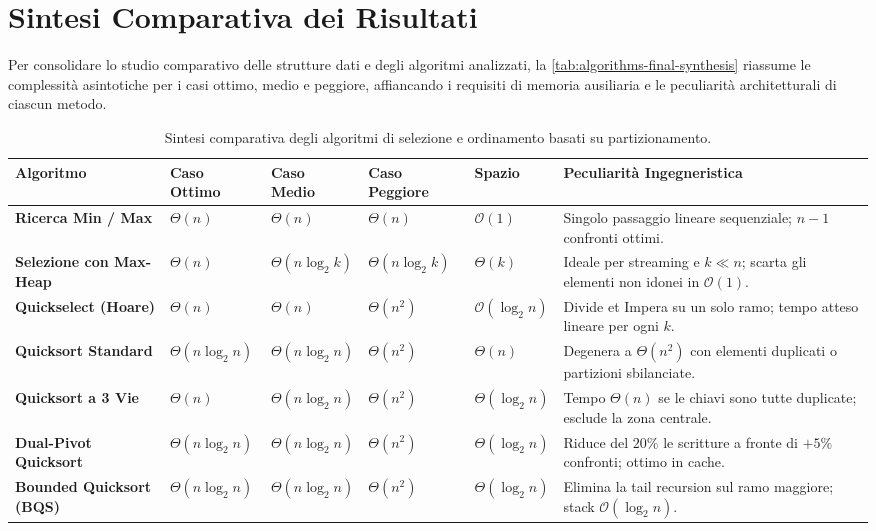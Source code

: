 \FloatBarrier
\section{Sintesi Comparativa dei Risultati}
\label{sec:comparative-results-summary}

Per consolidare lo studio comparativo delle strutture dati e degli algoritmi analizzati, la \autoref{tab:algorithms-final-synthesis} riassume le complessità asintotiche per i casi ottimo, medio e peggiore, affiancando i requisiti di memoria ausiliaria e le peculiarità architetturali di ciascun metodo.

\begin{table}[H]
  \centering
  \footnotesize
  \caption{Sintesi comparativa degli algoritmi di selezione e ordinamento basati su partizionamento.}
  \label{tab:algorithms-final-synthesis}
  \begin{tabularx}{\textwidth}{@{}>{\bfseries\arraybackslash}p{}>{\centering\arraybackslash}p{}>{\centering\arraybackslash}p{}>{\centering\arraybackslash}p{}>{\centering\arraybackslash}p{}Y@{}}
    \toprule
    Algoritmo & Caso Ottimo & Caso Medio & Caso Peggiore & Spazio & Peculiarità Ingegneristica \\
    \midrule
    Ricerca Min / Max & $\Theta(n)$ & $\Theta(n)$ & $\Theta(n)$ & $\mathcal{O}(1)$ & Singolo passaggio lineare sequenziale; $n-1$ confronti ottimi. \\
    \addlinespace
    Selezione con Max-Heap & $\Theta(n)$ & $\Theta(n \log_2 k)$ & $\Theta(n \log_2 k)$ & $\Theta(k)$ & Ideale per streaming e $k \ll n$; scarta gli elementi non idonei in $\mathcal{O}(1)$. \\
    \addlinespace
    Quickselect (Hoare) & $\Theta(n)$ & $\Theta(n)$ & $\Theta(n^2)$ & $\mathcal{O}(\log_2 n)$ & Divide et Impera su un solo ramo; tempo atteso lineare per ogni $k$. \\
    \addlinespace
    Quicksort Standard & $\Theta(n \log_2 n)$ & $\Theta(n \log_2 n)$ & $\Theta(n^2)$ & $\Theta(n)$ & Degenera a $\Theta(n^2)$ con elementi duplicati o partizioni sbilanciate. \\
    \addlinespace
    Quicksort a 3 Vie & $\Theta(n)$ & $\Theta(n \log_2 n)$ & $\Theta(n^2)$ & $\Theta(\log_2 n)$ & Tempo $\Theta(n)$ se le chiavi sono tutte duplicate; esclude la zona centrale. \\
    \addlinespace
    Dual-Pivot Quicksort & $\Theta(n \log_2 n)$ & $\Theta(n \log_2 n)$ & $\Theta(n^2)$ & $\Theta(\log_2 n)$ & Riduce del $20\%$ le scritture a fronte di $+5\%$ confronti; ottimo in cache. \\
    \addlinespace
    Bounded Quicksort (BQS) & $\Theta(n \log_2 n)$ & $\Theta(n \log_2 n)$ & $\Theta(n^2)$ & $\Theta(\log_2 n)$ & Elimina la tail recursion sul ramo maggiore; stack $\mathcal{O}(\log_2 n)$. \\
    \bottomrule
  \end{tabularx}
\end{table}

